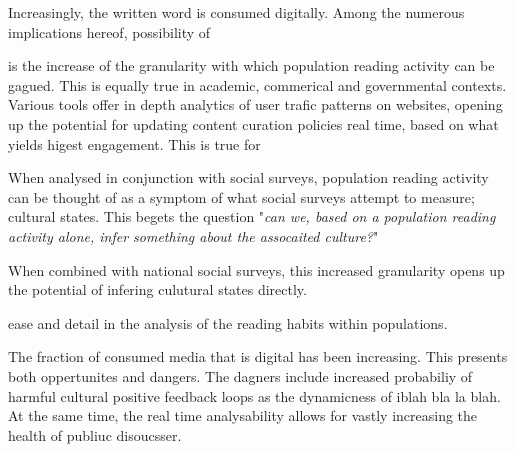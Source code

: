 Increasingly, the written word is consumed digitally.
Among the numerous implications hereof, possibility of

is the increase of the granularity with which population reading activity can be gagued.
This is equally true in academic, commerical and governmental contexts.
Various tools offer in depth analytics of user trafic patterns on websites, opening up the potential for updating content curation policies real time, based on what yields higest engagement.
This is true for

When analysed in conjunction with social surveys, population reading activity can be thought of as a symptom of what social surveys attempt to measure; cultural states.
This begets the question "\emph{can we, based on a population reading activity alone, infer something about the assocaited culture?}"

When combined with national social surveys, this increased granularity opens up the potential of infering culutural states directly.



ease and detail in the analysis of the reading habits within populations.

The fraction of consumed media that is digital has been increasing. This presents both oppertunites and dangers. The dagners include increased probabiliy of harmful cultural positive feedback loops as the dynamicness of iblah bla la blah. At the same time, the real time analysability allows for vastly increasing the health of publiuc disoucsser.
